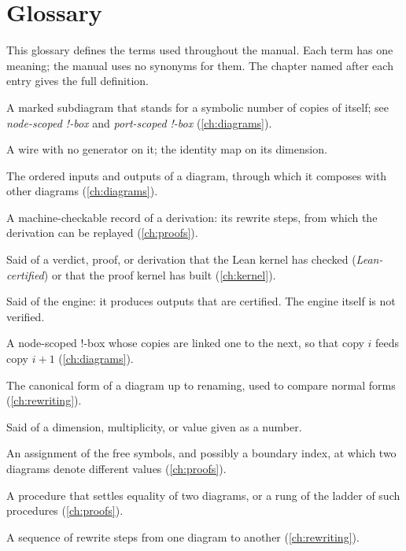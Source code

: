 \chapter{Glossary}\label{app:glossary}

This glossary defines the terms used throughout the manual. Each term has one meaning; the manual uses no synonyms for them. The chapter named after each entry gives the full definition.

\begin{description}[style=nextline,leftmargin=1.5em,font=\normalfont\bfseries]
\item[!-box] A marked subdiagram that stands for a symbolic number of copies of itself; see \emph{node-scoped !-box} and \emph{port-scoped !-box} (\cref{ch:diagrams}).
\item[bare wire] A wire with no generator on it; the identity map on its dimension.
\item[boundary] The ordered inputs and outputs of a diagram, through which it composes with other diagrams (\cref{ch:diagrams}).
\item[certificate] A machine-checkable record of a derivation: its rewrite steps, from which the derivation can be replayed (\cref{ch:proofs}).
\item[certified] Said of a verdict, proof, or derivation that the Lean kernel has checked (\emph{Lean-certified}) or that the proof kernel has built (\cref{ch:kernel}).
\item[certifying] Said of the engine: it produces outputs that are certified. The engine itself is not verified.
\item[chain box] A node-scoped !-box whose copies are linked one to the next, so that copy $i$ feeds copy $i+1$ (\cref{ch:diagrams}).
\item[comparison view] The canonical form of a diagram up to renaming, used to compare normal forms (\cref{ch:rewriting}).
\item[concrete] Said of a dimension, multiplicity, or value given as a number.
\item[counterexample] An assignment of the free symbols, and possibly a boundary index, at which two diagrams denote different values (\cref{ch:proofs}).
\item[decision procedure] A procedure that settles equality of two diagrams, or a rung of the ladder of such procedures (\cref{ch:proofs}).
\item[derivation] A sequence of rewrite steps from one diagram to another (\cref{ch:rewriting}).

\end{description}
